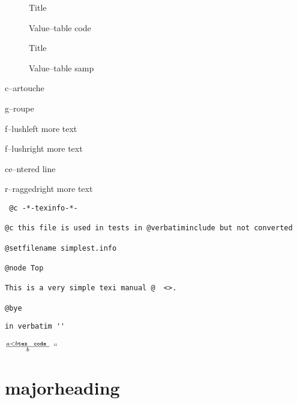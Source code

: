 \documentclass{book}
\newcommand\GNUTexinfotablestylesamp[1]{\ifstrempty{#1}{}{{`\texttt{#1}'}}}%
\newcommand{\GNUTexinfoplaceholder}[1]{}
\newcommand{\GNUTexinfonopagebreakheading}[2]{\let\clearpage\relax \let\cleardoublepage\relax \let\thispagestyle\GNUTexinfoplaceholder #1{#2}}
\begin{document}
\begin{titlepage}
\begin{description}
\item[] Title
\item[{\parbox[b]{\linewidth}{%
\texttt{a{-}{-}code}}}]
Value--table code
\end{description}

\begin{description}
\item[] Title
\item[{\parbox[b]{\linewidth}{%
\GNUTexinfotablestylesamp{a{-}{-}samp}\\
\GNUTexinfotablestylesamp{a2{-}{-}samp}}}]
Value--table samp
\end{description}

\begin{mdframed}[style=GNUTexinfocartouche]
c--artouche
\end{mdframed}

g--roupe

f--lushleft
more text

f--lushright
more text

\begin{center}
ce--ntered line
\end{center}

\begin{flushleft}
r--raggedright
more text
\end{flushleft}

\begin{verbatim}
 @c -*-texinfo-*-

@c this file is used in tests in @verbatiminclude but not converted

@setfilename simplest.info

@node Top

This is a very simple texi manual @  <>.

@bye
\end{verbatim}

\begin{verbatim}
in verbatim ''
\end{verbatim}





$\frac{a < b \texttt{tex \hbox{ code }}}{b}$ ``

\GNUTexinfonopagebreakheading{\chapter*}{majorheading}


\end{titlepage}
\end{document}
